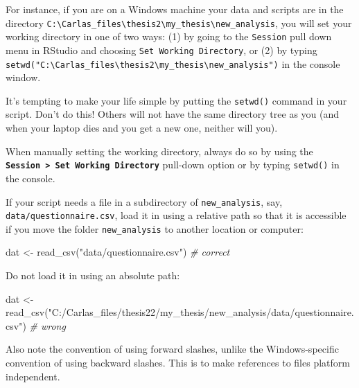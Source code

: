 \documentclass[
  oneside]{book}
\newenvironment{Shaded}{\begin{snugshade}}{\end{snugshade}}
\newcommand{\CommentTok}[1]{\textcolor[rgb]{0.56,0.35,0.01}{\textit{#1}}}
\newcommand{\FunctionTok}[1]{\textcolor[rgb]{0.00,0.00,0.00}{#1}}
\newcommand{\NormalTok}[1]{#1}
\newcommand{\OtherTok}[1]{\textcolor[rgb]{0.56,0.35,0.01}{#1}}
\newcommand{\StringTok}[1]{\textcolor[rgb]{0.31,0.60,0.02}{#1}}
\begin{document}
For instance, if you are on a Windows machine your data and scripts are in the directory \texttt{C:\textbackslash{}Carla\textquotesingle{}s\_files\textbackslash{}thesis2\textbackslash{}my\_thesis\textbackslash{}new\_analysis}, you will set your working directory in one of two ways: (1) by going to the \texttt{Session} pull down menu in RStudio and choosing \texttt{Set\ Working\ Directory}, or (2) by typing \texttt{setwd("C:\textbackslash{}Carla\textquotesingle{}s\_files\textbackslash{}thesis2\textbackslash{}my\_thesis\textbackslash{}new\_analysis")} in the console window.

\begin{warning}
It's tempting to make your life simple by putting the \texttt{setwd()} command in your script. Don't do this! Others will not have the same directory tree as you (and when your laptop dies and you get a new one, neither will you).

When manually setting the working directory, always do so by using the \textbf{\texttt{Session\ \textgreater{}\ Set\ Working\ Directory}} pull-down option or by typing \texttt{setwd()} in the console.

\end{warning}

If your script needs a file in a subdirectory of \texttt{new\_analysis}, say, \texttt{data/questionnaire.csv}, load it in using a relative path so that it is accessible if you move the folder \texttt{new\_analysis} to another location or computer:

\begin{Shaded}
\begin{Highlighting}[]
\NormalTok{dat }\OtherTok{\textless{}{-}} \FunctionTok{read\_csv}\NormalTok{(}\StringTok{"data/questionnaire.csv"}\NormalTok{)  }\CommentTok{\# correct}
\end{Highlighting}
\end{Shaded}

Do not load it in using an absolute path:

\begin{Shaded}
\begin{Highlighting}[]
\NormalTok{dat }\OtherTok{\textless{}{-}} \FunctionTok{read\_csv}\NormalTok{(}\StringTok{"C:/Carla\textquotesingle{}s\_files/thesis22/my\_thesis/new\_analysis/data/questionnaire.csv"}\NormalTok{)   }\CommentTok{\# wrong}
\end{Highlighting}
\end{Shaded}

\begin{info}
Also note the convention of using forward slashes, unlike the Windows-specific convention of using backward slashes. This is to make references to files platform independent.

\end{info}
\end{document}
